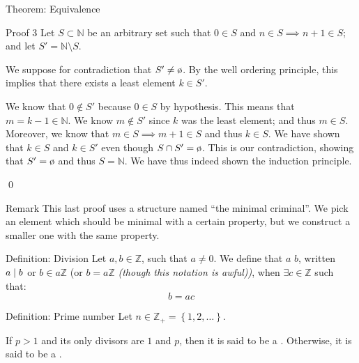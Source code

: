\documentclass[a4paper]{article}
\begin{document}
\begin{parag}{Theorem: Equivalence}
\begin{subparag}{Proof 3}
        Let $S \subset \mathbb{N}$ be an arbitrary set such that $0 \in S$ and $n \in S \implies n + 1 \in S$; and let $S' = \mathbb{N} \setminus S$.

        We suppose for contradiction that $S' \neq \o$. By the well ordering principle, this implies that there exists a least element $k \in S'$.

        We know that $0 \not \in S'$ because $0 \in S$ by hypothesis. This means that $m = k-1 \in \mathbb{N}$. We know $m \not \in S'$ since $k$ was the least element; and thus $m \in S$. Moreover, we know that $m \in S \implies m+1 \in S$ and thus $k \in S$. We have shown that $k \in S$ and $k \in S'$ even though $S \cap S' = \o$. This is our contradiction, showing that $S' = \o$ and thus $S = \mathbb{N}$. We have thus indeed shown the induction principle.

        \qed
    \end{subparag}
    
    \begin{subparag}{Remark}
        This last proof uses a structure named ``the minimal criminal''. We pick an element which should be minimal with a certain property, but we construct a smaller one with the same property.
    \end{subparag}
\end{parag}

\begin{parag}{Definition: Division}
    Let $a, b \in \mathbb{Z}$, such that $a \neq 0$. We define that $a$  $b$, written $a \mid b$ or $b \in a\mathbb{Z}$ (or $b = a \mathbb{Z}$ \textit{(though this notation is awful))}, when $\exists c \in \mathbb{Z}$ such that: 
    \[b = ac\]
\end{parag}

\begin{parag}{Definition: Prime number}
    Let $n \in \mathbb{Z}_+ = \left\{1, 2, \ldots\right\}$.

    If $p > 1$ and its only divisors are $1$ and $p$, then it is said to be a . Otherwise, it is said to be a .
\end{parag}
\end{document}
